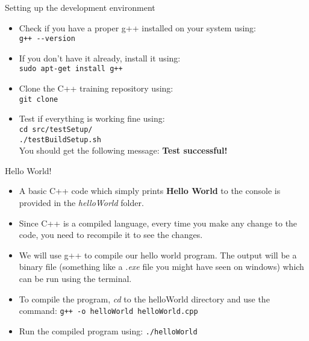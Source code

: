 \documentclass[aspectratio=169]{beamer}
\begin{document}
\begin{frame}[fragile]{Setting up the development environment}
    \begin{itemize}
        \item Check if you have a proper g++ installed on your system using:\\ \verb|g++ --version|
        \item If you don't have it already, install it using:\\ \verb|sudo apt-get install g++|
        \item Clone the C++ training repository using: \\ \verb|git clone |
        \item Test if everything is working fine using: \\ \verb|cd src/testSetup/| \\ \verb|./testBuildSetup.sh| \\ You should get the following message: \textbf{Test successful!}
    \end{itemize}
\end{frame}

\begin{frame}[fragile]{Hello World!}
    \begin{itemize}
        \item A basic C++ code which simply prints \textbf{Hello World} to the console is provided in the \textit{helloWorld} folder.
        \item Since C++ is a compiled language, every time you make any change to the code, you need to recompile it to see the changes.
        \item We will use g++ to compile our hello world program. The output will be a binary file (something like a \textit{.exe} file you might have seen on windows) which can be run using the terminal.
        \item To compile the program, \textit{cd} to the helloWorld directory and use the command: \verb|g++ -o helloWorld helloWorld.cpp|
        \item Run the compiled program using: \verb|./helloWorld|
    \end{itemize}
\end{frame}
\end{document}

